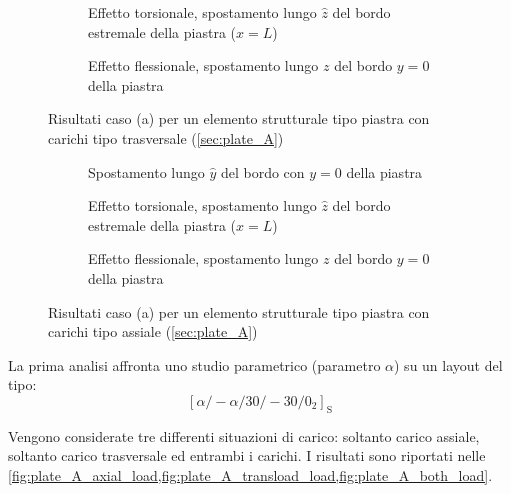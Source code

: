 \documentclass[a4paper,num-refs]{oup-contemporary}
\begin{document}
\begin{figure}[bt!]
\begin{subfigure}[t]{0.3\textwidth}
		\caption{Effetto torsionale, spostamento lungo $\hat z$ del bordo estremale della piastra ($x=L$)}
		
	\end{subfigure}
	\hfill
	\begin{subfigure}[t]{0.3\textwidth}
		\centering
		\caption{Effetto flessionale, spostamento lungo $z$ del bordo $y=0$ della piastra}

	\end{subfigure}
	\hfill
	\caption{Risultati caso (a) per un elemento strutturale tipo piastra con carichi tipo trasversale (\cref{sec:plate_A})}
	\label{fig:plate_A_transload_load}

	\centering
	
	\begin{subfigure}[t]{0.3\textwidth}
		\centering
		\caption{Spostamento lungo $\hat y$ del bordo con $y=0$ della piastra}
		
	\end{subfigure}
	\hfill
	\begin{subfigure}[t]{0.3\textwidth}
		\centering
		
		\caption{Effetto torsionale, spostamento lungo $\hat z$ del bordo estremale della piastra ($x=L$)}
		
	\end{subfigure}
	\hfill
	\begin{subfigure}[t]{0.3\textwidth}
		\centering
		\caption{Effetto flessionale, spostamento lungo $z$ del bordo $y=0$ della piastra}
				\label{fig:plate_A_extra}
	\end{subfigure}
	\hfill
	\caption{Risultati caso (a) per un elemento strutturale tipo piastra con carichi tipo assiale (\cref{sec:plate_A})}
	\label{fig:plate_A_axial_load}
\end{figure}



La prima analisi affronta uno studio parametrico (parametro $\alpha$) su un layout del tipo:
\begin{equation}
	\left[\alpha /-\alpha / 30 /-30 / 0_{2}\right]_{\mathrm{S}}
\end{equation}

Vengono considerate tre differenti situazioni di carico: soltanto carico assiale, soltanto carico trasversale ed entrambi i carichi. I risultati sono riportati nelle \cref{fig:plate_A_axial_load,fig:plate_A_transload_load,fig:plate_A_both_load}. 
\end{document}
